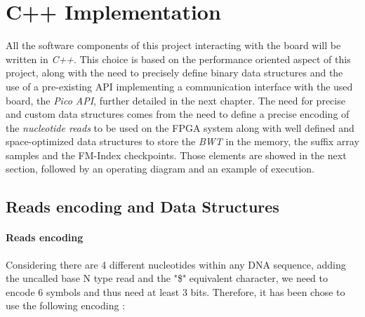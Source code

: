 \section{C++ Implementation}

All the software components of this project interacting with the board will be written in \textsl{C++}. This choice is based on the performance oriented aspect of this project, along with the need to precisely define binary data structures and the use of a pre-existing API implementing a communication interface with the used board, the \textit{Pico API}, further detailed in the next chapter. The need for precise and custom data structures comes from the need to define a precise encoding of the \textsl{nucleotide reads} to be used on the FPGA system along with well defined and space-optimized data structures to store the \textsl{BWT} in the memory, the suffix array samples and the FM-Index checkpoints. Those elements are showed in the next section, followed by an operating diagram and an example of execution.

\subsection{Reads encoding and Data Structures}

\paragraph{Reads encoding}

Considering there are 4 different nucleotides within any DNA sequence, adding the uncalled base N type read and the "\$" equivalent character, we need to encode 6 symbols and thus need at least 3 bits. Therefore, it has been chose to use the following encoding : \\

